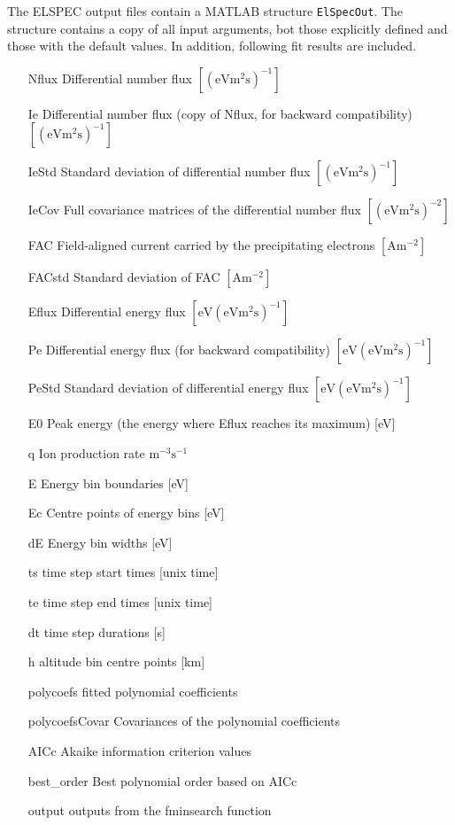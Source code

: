 \documentclass[12pt,a4paper]{report}
\begin{document}
The ELSPEC output files contain a MATLAB structure \verb|ElSpecOut|. The structure contains a copy of all input arguments, bot those explicitly defined and those with the default values. In addition, following fit results are included.

\begin{itemize}
\item[Nflux] Differential number flux $\mathrm{[(eVm^2s)^{-1}]}$
\item[Ie] Differential number flux (copy of Nflux, for backward compatibility) $\mathrm{[(eVm^2s)^{-1}]}$
\item[IeStd] Standard deviation of differential number flux $\mathrm{[(eVm^2s)^{-1}]}$
\item[IeCov] Full covariance matrices of the differential number flux $\mathrm{[(eVm^2s)^{-2}]}$
\item[FAC] Field-aligned current carried by the precipitating electrons $\mathrm{[Am^{-2}]}$
\item[FACstd] Standard deviation of FAC $\mathrm{[Am^{-2}]}$
\item[Eflux] Differential energy flux $\mathrm{[eV(eVm^2s)^{-1}]}$
\item[Pe] Differential energy flux (for backward compatibility) $\mathrm{[eV(eVm^2s)^{-1}]}$
\item[PeStd] Standard deviation of differential energy flux $\mathrm{[eV(eVm^2s)^{-1}]}$
\item[E0] Peak energy (the energy where Eflux reaches its maximum) [eV]
\item[q] Ion production rate $\mathrm{m^{-3}s^{-1}}$
\item[E] Energy bin boundaries [eV]
\item[Ec] Centre points of energy bins [eV]
\item[dE] Energy bin widths [eV]
\item[ts] time step start times [unix time]
\item[te] time step end times [unix time]
\item[dt] time step durations [s]
\item[h] altitude bin centre points [km]
\item[polycoefs] fitted polynomial coefficients
\item[polycoefsCovar] Covariances of the polynomial coefficients
\item[AICc] Akaike information criterion values
\item[best\_order] Best polynomial order based on AICc
\item[output] outputs from the fminsearch function

\end{itemize}
\end{document}
